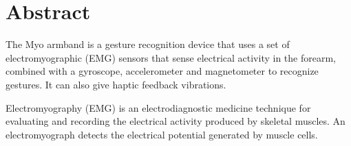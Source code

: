 \chapter{Abstract}
The Myo armband is a gesture recognition device that uses a set of electromyographic (EMG) sensors that sense electrical activity in the forearm, combined with a gyroscope, accelerometer and magnetometer to recognize gestures. It can also give haptic feedback vibrations.

Electromyography (EMG) is an electrodiagnostic medicine technique for evaluating and recording the electrical activity produced by skeletal muscles. An electromyograph detects the electrical potential generated by muscle cells.
